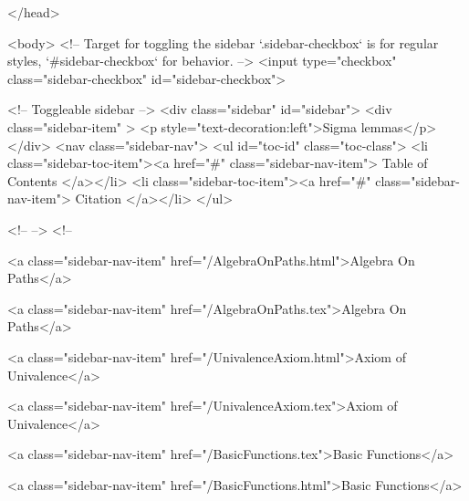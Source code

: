   
</head>




  <body>
    <!-- Target for toggling the sidebar `.sidebar-checkbox` is for regular
     styles, `#sidebar-checkbox` for behavior. -->
<input type="checkbox" class="sidebar-checkbox" id="sidebar-checkbox">

<!-- Toggleable sidebar -->
<div class="sidebar" id="sidebar">
  <div class="sidebar-item" >
    <p style="text-decoration:left">Sigma lemmas</p>
  </div>
  <nav class="sidebar-nav">
    <ul id="toc-id" class="toc-class">
  <li class="sidebar-toc-item"><a href="#" class="sidebar-nav-item"> Table of Contents </a></li>
  <li class="sidebar-toc-item"><a href="#" class="sidebar-nav-item"> Citation </a></li>
</ul>


    <!--  -->
    <!-- 
      
    
      
    
      
    
      
        
      
    
      
        
          <a class="sidebar-nav-item" href="/AlgebraOnPaths.html">Algebra On Paths</a>
        
      
    
      
        
          <a class="sidebar-nav-item" href="/AlgebraOnPaths.tex">Algebra On Paths</a>
        
      
    
      
        
          <a class="sidebar-nav-item" href="/UnivalenceAxiom.html">Axiom of Univalence</a>
        
      
    
      
        
          <a class="sidebar-nav-item" href="/UnivalenceAxiom.tex">Axiom of Univalence</a>
        
      
    
      
        
          <a class="sidebar-nav-item" href="/BasicFunctions.tex">Basic Functions</a>
        
      
    
      
        
          <a class="sidebar-nav-item" href="/BasicFunctions.html">Basic Functions</a>
        
      
    
      
        
